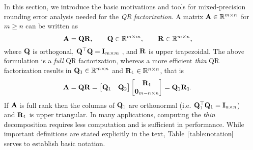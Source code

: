 In this section, we introduce the basic motivations and tools for mixed-precision rounding error analysis needed for the {\it QR factorization}.
A matrix $\mathbf{A} \in \mathbb{R}^{m \times n}$ for $m\geq n$ can be written as
$$\mathbf{A} = \mathbf{QR},
\qquad
\mathbf{Q} \in \mathbb{R}^{m \times m},
\qquad
\mathbf{R} \in \mathbb{R}^{m \times n},$$
where $\mathbf{Q}$ is orthogonal, $\mathbf{Q}^\top \mathbf{Q} = \mathbf{I}_{m\times m}$ , and $\mathbf{R}$ is upper trapezoidal.
The above formulation is a \emph{full} QR factorization, whereas a more efficient \emph{thin} QR factorization results in $\mathbf{Q}_{1}\in\mathbb{R}^{m\times n}$ and $\mathbf{R}_{1}\in\mathbb{R}^{n\times n}$, that is
\[
\mathbf{A} = \mathbf{QR} = \begin{bmatrix}\mathbf{Q}_{1} & \mathbf{Q}_2\end{bmatrix} \begin{bmatrix}\mathbf{R}_{1} \\ \mathbf{0}_{m-n \times n}\end{bmatrix} = \mathbf{Q}_{1}\mathbf{R}_{1}.
\]
If $\mathbf{A}$ is full rank then the columns of $\mathbf{Q}_{1}$ are orthonormal (i.e. $\mathbf{Q}_{1}^{\top}\mathbf{Q}_{1}=\mathbf{I}_{n\times n}$) and $\mathbf{R}_1$ is upper triangular.
In many applications, computing the \emph{thin} decomposition requires less computation and is sufficient in performance. 
While important definitions are stated explicitly in the text, Table~\ref{table:notation} serves to establish basic notation.
